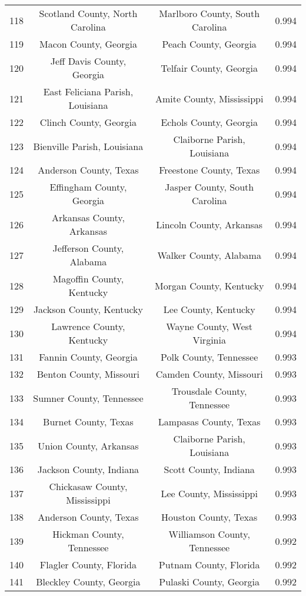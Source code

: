 \begin{longtable}{cccc}
  118 & Scotland County, North Carolina & Marlboro County, South Carolina & 0.994 \\ 
  119 & Macon County, Georgia & Peach County, Georgia & 0.994 \\ 
  120 & Jeff Davis County, Georgia & Telfair County, Georgia & 0.994 \\ 
  121 & East Feliciana Parish, Louisiana & Amite County, Mississippi & 0.994 \\ 
  122 & Clinch County, Georgia & Echols County, Georgia & 0.994 \\ 
  123 & Bienville Parish, Louisiana & Claiborne Parish, Louisiana & 0.994 \\ 
  124 & Anderson County, Texas & Freestone County, Texas & 0.994 \\ 
  125 & Effingham County, Georgia & Jasper County, South Carolina & 0.994 \\ 
  126 & Arkansas County, Arkansas & Lincoln County, Arkansas & 0.994 \\ 
  127 & Jefferson County, Alabama & Walker County, Alabama & 0.994 \\ 
  128 & Magoffin County, Kentucky & Morgan County, Kentucky & 0.994 \\ 
  129 & Jackson County, Kentucky & Lee County, Kentucky & 0.994 \\ 
  130 & Lawrence County, Kentucky & Wayne County, West Virginia & 0.994 \\ 
  131 & Fannin County, Georgia & Polk County, Tennessee & 0.993 \\ 
  132 & Benton County, Missouri & Camden County, Missouri & 0.993 \\ 
  133 & Sumner County, Tennessee & Trousdale County, Tennessee & 0.993 \\ 
  134 & Burnet County, Texas & Lampasas County, Texas & 0.993 \\ 
  135 & Union County, Arkansas & Claiborne Parish, Louisiana & 0.993 \\ 
  136 & Jackson County, Indiana & Scott County, Indiana & 0.993 \\ 
  137 & Chickasaw County, Mississippi & Lee County, Mississippi & 0.993 \\ 
  138 & Anderson County, Texas & Houston County, Texas & 0.993 \\ 
  139 & Hickman County, Tennessee & Williamson County, Tennessee & 0.992 \\ 
  140 & Flagler County, Florida & Putnam County, Florida & 0.992 \\ 
  141 & Bleckley County, Georgia & Pulaski County, Georgia & 0.992 \\ 

\end{longtable}
